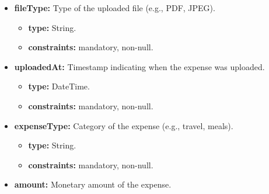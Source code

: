 \begin{itemize} [leftmargin=0.75cm, noitemsep, label=\textbullet]
\begin{itemize} [leftmargin=0.75cm, noitemsep, label=$\circ$]
        \item \textbf{type:} String.

        \item \textbf{constraints:} mandatory, non-null.

    \end{itemize}

    \item \textbf{fileType:} Type of the uploaded file (e.g., PDF, JPEG).
    
    \begin{itemize} [leftmargin=0.75cm, noitemsep, label=$\circ$]

        \item \textbf{type:} String.

        \item \textbf{constraints:} mandatory, non-null.

    \end{itemize}

    \item \textbf{uploadedAt:} Timestamp indicating when the expense was uploaded.
    
    \begin{itemize} [leftmargin=0.75cm, noitemsep, label=$\circ$]

        \item \textbf{type:} DateTime.

        \item \textbf{constraints:} mandatory, non-null.

    \end{itemize}

    \item \textbf{expenseType:} Category of the expense (e.g., travel, meals).
    
    \begin{itemize} [leftmargin=0.75cm, noitemsep, label=$\circ$]

        \item \textbf{type:} String.

        \item \textbf{constraints:} mandatory, non-null.

    \end{itemize}

    \newpage

    \item \textbf{amount:} Monetary amount of the expense.
    
    \begin{itemize} [leftmargin=0.75cm, noitemsep, label=$\circ$]


\end{itemize}
\end{itemize}
